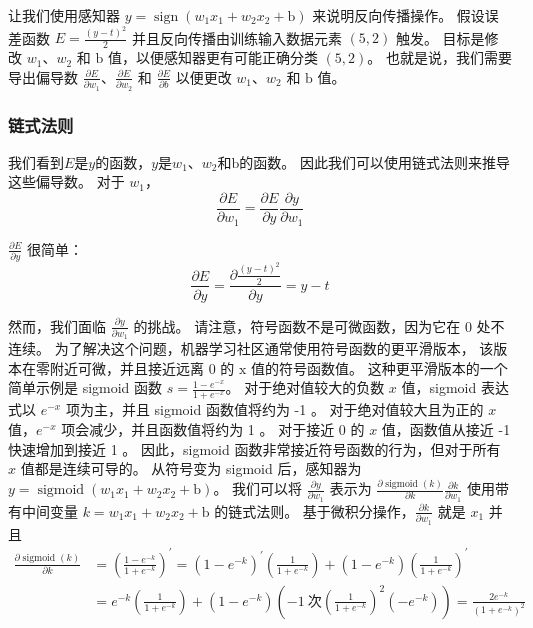 让我们使用感知器 $y=\operatorname{sign}\left(w_{1} x_{1}+w_{2} x_{2}+\mathrm{b}\right)$ 来说明反向传播操作。 
假设误差函数 $E=\frac{(y-t)^{2}}{2}$ 并且反向传播由训练输入数据元素 $(5,2)$ 触发。 
目标是修改 $w_{1}、w_{2}$ 和 $\mathrm{b}$ 值，以便感知器更有可能正确分类 $(5,2)$。 
也就是说，我们需要导出偏导数 $\frac{\partial E}{\partial w_{1}}、\frac{\partial E}{\partial w_{2}}$ 
和 $\frac {\partial E}{\partial b}$ 以便更改 $w_{1}、w_{2}$ 和 $\mathrm{b}$ 值。

\subsubsection{链式法则}
我们看到$E$是$y$的函数，$y$是$w_{1}、w_{2}$和$\mathrm{b}$的函数。 因此我们可以使用链式法则来推导这些偏导数。 
对于 $w_{1}$，
$$
\frac{\partial E}{\partial w_{1}}=\frac{\partial E}{\partial y} \frac{\partial y}{\partial w_{1}}
$$

$\frac{\partial E}{\partial y}$ 很简单：
$$
\frac{\partial E}{\partial y}=\frac{\partial \frac{(y-t)^{2}}{2}}{\partial y}=y-t
$$

然而，我们面临 $\frac{\partial y}{\partial w_{1}}$ 的挑战。 请注意，符号函数不是可微函数，因为它在 0 处不连续。 
为了解决这个问题，机器学习社区通常使用符号函数的更平滑版本，
该版本在零附近可微，并且接近远离 0 的 $\mathrm{x}$ 值的符号函数值。 
这种更平滑版本的一个简单示例是 sigmoid 函数 $s=\frac{1-e^{-x}}{1+e^{-x}}$。 
对于绝对值较大的负数 $x$ 值，sigmoid 表达式以 $e^{-x}$ 项为主，并且 sigmoid 函数值将约为 -1 。 
对于绝对值较大且为正的 $x$ 值，$e^{-x}$ 项会减少，并且函数值将约为 1 。 
对于接近 0 的 $x$ 值，函数值从接近 -1 快速增加到接近 1 。 
因此，sigmoid 函数非常接近符号函数的行为，但对于所有 $x$ 值都是连续可导的。 
从符号变为 sigmoid 后，感知器为 $y=\operatorname{sigmoid}\left(w_{1} x_{1}+w_{2} x_{2}+\mathrm{b}\right)$。 
我们可以将 $\frac{\partial y}{\partial w_{1}}$ 
表示为 $\frac{\partial \operatorname{sigmoid}(k)}{\partial k} \frac{\partial k}{\partial w_{1}}$ 
使用带有中间变量 $k=w_{1} x_{1}+w_{2} x_{2}+\mathrm{b}$ 的链式法则。 
基于微积分操作，$\frac{\partial k}{\partial w_{1}}$ 就是 $x_{1}$ 并且
$$
\begin{aligned}
\frac{\partial \operatorname{sigmoid}(k)}{\partial k} & =\left(\frac{1-e^{-k}}{1+e^{-k}}\right)^ {\prime}=\left(1-e^{-k}\right)^{\prime}\left(\frac{1}{1+e^{-k}}\right)+\left(1 -e^{-k}\right)\left(\frac{1}{1+e^{-k}}\right)^{\prime} \\
& =e^{-k}\left(\frac{1}{1+e^{-k}}\right)+\left(1-e^{-k}\right)\left(-1 \ 次\left(\frac{1}{1+e^{-k}}\right)^{2}\left(-e^{-k}\right)\right)=\frac{2 e^{ -k}}{\left(1+e^{-k}\right)^{2}}
\end{aligned}
$$

